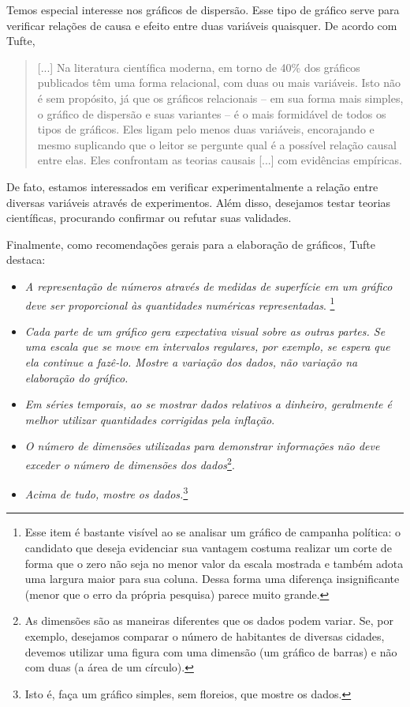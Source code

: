 Temos especial interesse nos gráficos de dispersão. Esse tipo de gráfico serve para verificar relações de causa e efeito entre duas variáveis quaisquer. De acordo com Tufte,
\begin{quote}
	[...] Na literatura científica moderna, em torno de 40\% dos gráficos publicados têm uma forma relacional, com duas ou mais variáveis. Isto não é sem propósito, já que os gráficos relacionais -- em sua forma mais simples, o gráfico de dispersão e suas variantes -- é o mais formidável de todos os tipos de gráficos. Eles ligam pelo menos duas variáveis, encorajando e mesmo suplicando que o leitor se pergunte qual é a possível relação causal entre elas. Eles confrontam as teorias causais [...] com evidências empíricas.
\end{quote}
%
De fato, estamos interessados em verificar experimentalmente a relação entre diversas variáveis através de experimentos. Além disso, desejamos testar teorias científicas, procurando confirmar ou refutar suas validades.

Finalmente, como recomendações gerais para a elaboração de gráficos, Tufte destaca:
\begin{itemize}
	\item \emph{A representação de números através de medidas de superfície em um gráfico deve ser proporcional às quantidades numéricas representadas}. \footnote[][-3cm]{Esse item é bastante visível ao se analisar um gráfico de campanha política: o candidato que deseja evidenciar sua vantagem costuma realizar um corte de forma que o zero não seja no menor valor da escala mostrada e também adota uma largura maior para sua coluna. Dessa forma uma diferença insignificante (menor que o erro da própria pesquisa) parece muito grande.}
	\item \emph{Cada parte de um gráfico gera expectativa visual sobre as outras partes. Se uma escala que se move em intervalos regulares, por exemplo, se espera que ela continue a fazê-lo. Mostre a variação dos dados, não variação na elaboração do gráfico.}
	\item \emph{Em séries temporais, ao se mostrar dados relativos a dinheiro, geralmente é melhor utilizar quantidades corrigidas pela inflação}.
	\item \emph{O número de dimensões utilizadas para demonstrar informações não deve exceder o número de dimensões dos dados}\footnote{As dimensões são as maneiras diferentes que os dados podem variar. Se, por exemplo, desejamos comparar o número de habitantes de diversas cidades, devemos utilizar uma figura com uma dimensão (um gráfico de barras) e não com duas (a área de um círculo).}.
	\item \emph{Acima de tudo, mostre os dados.}\footnote{Isto é, faça um gráfico simples, sem floreios, que mostre os dados.}
\end{itemize}


